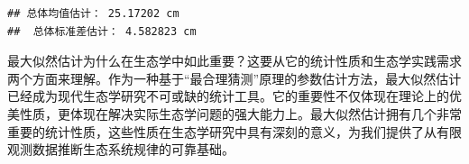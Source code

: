 \documentclass[
  twoside,12pt,fontset=none]{ctexbook}
\newenvironment{Shaded}{\begin{snugshade}}{\end{snugshade}}
\newcommand{\DecValTok}[1]{\textcolor[rgb]{0.00,0.00,0.81}{#1}}
\newcommand{\FunctionTok}[1]{\textcolor[rgb]{0.13,0.29,0.53}{\textbf{#1}}}
\newcommand{\NormalTok}[1]{#1}
\newcommand{\SpecialCharTok}[1]{\textcolor[rgb]{0.81,0.36,0.00}{\textbf{#1}}}
\newcommand{\StringTok}[1]{\textcolor[rgb]{0.31,0.60,0.02}{#1}}
\begin{document}
\begin{Shaded}
\end{Shaded}

\begin{verbatim}
## 总体均值估计： 25.17202 cm
##  总体标准差估计： 4.582823 cm
\end{verbatim}

最大似然估计为什么在生态学中如此重要？这要从它的统计性质和生态学实践需求两个方面来理解。作为一种基于``最合理猜测''原理的参数估计方法，最大似然估计已经成为现代生态学研究不可或缺的统计工具。它的重要性不仅体现在理论上的优美性质，更体现在解决实际生态学问题的强大能力上。最大似然估计拥有几个非常重要的统计性质，这些性质在生态学研究中具有深刻的意义，为我们提供了从有限观测数据推断生态系统规律的可靠基础。
\end{document}
